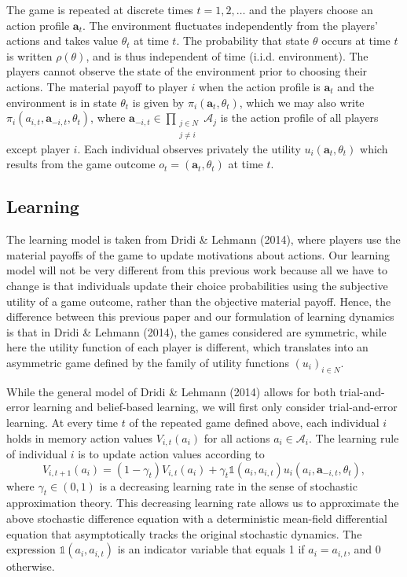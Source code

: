 \documentclass[11pt,reqno]{amsart}
\newcommand{\st}{\rho}
\newcommand{\e}{\theta}
\newcommand{\At}{V}
\newcommand{\ac}{a}
\newcommand{\Ac}{\mathcal{A}}
\newcommand{\va}{\mathbf{a}}
\newcommand{\iv}{\mathds{1}}
\newcommand{\pay}{\pi}
\newcommand{\lr}{\gamma}
\newcommand{\np}{N}%
\newcommand{\tm}{t}%
\newcommand{\om}{o}
\newcommand{\pf}{u}
\begin{document}
The game is repeated at discrete times $\tm = 1,2,\dots$ and the players choose an action profile $\va_\tm$. The environment fluctuates independently from the players' actions and takes value $\e_\tm$ at time $\tm$. The probability that state $\e$ occurs at time $\tm$ is written $\st(\e)$, and is thus independent of time (i.i.d. environment). The players cannot observe the state of the environment prior to choosing their actions. The material payoff to player $i$ when the action profile is $\va_\tm$ and the environment is in state $\e_\tm$ is given by $\pay_i(\va_\tm,\e_\tm)$, which we may also write $\pay_i(\ac_{i,t}, \va_{-i,t},\e_\tm)$, where $\va_{-i,t} \in \prod_{\substack{j\in \np \\ j\neq i}} \Ac_j$ is the action profile of all players except player $i$. Each individual observes privately the utility $\pf_i(\va_\tm,\e_\tm)$ which results from the game outcome $\om_\tm = (\va_\tm,\e_\tm)$ at time $\tm$.



\subsection{Learning}

The learning model is taken from Dridi \& Lehmann (2014), where players use the material payoffs of the game to update motivations about actions. Our learning model will not be very different from this previous work because all we have to change is that individuals update their choice probabilities using the subjective utility of a game outcome, rather than the objective material payoff. Hence, the difference between this previous paper and our formulation of learning dynamics is that in Dridi \& Lehmann (2014), the games considered are symmetric, while here the utility function of each player is different, which translates into an asymmetric game defined by the family of utility functions $(\pf_i)_{i\in \np}$.

While the general model of Dridi \& Lehmann (2014) allows for both trial-and-error learning and belief-based learning, we will first only consider trial-and-error learning. At every time $\tm$ of the repeated game defined above, each individual $i$ holds in memory action values $\At_{i,\tm}(\ac_i)$ for all actions $\ac_i \in \Ac_i$. The learning rule of individual $i$ is to update action values according to
\begin{equation}
\label{Lrule1}
\At_{i,\tm+1}(\ac_i) = (1-\lr_\tm) \At_{i,\tm}(\ac_i) + \lr_\tm  \iv(\ac_i,\ac_{i,\tm}) \pf_{i}(\ac_i,\va_{-i,\tm},\e_\tm),
\end{equation} 
where $\lr_\tm \in (0,1)$ is a decreasing learning rate in the sense of stochastic approximation theory. This decreasing learning rate allows us to approximate the above stochastic difference equation with a deterministic mean-field differential equation that asymptotically tracks the original stochastic dynamics. The expression $\iv(\ac_i,\ac_{i,\tm})$ is an indicator variable that equals 1 if $\ac_i = \ac_{i,\tm}$, and 0 otherwise.
\end{document}

